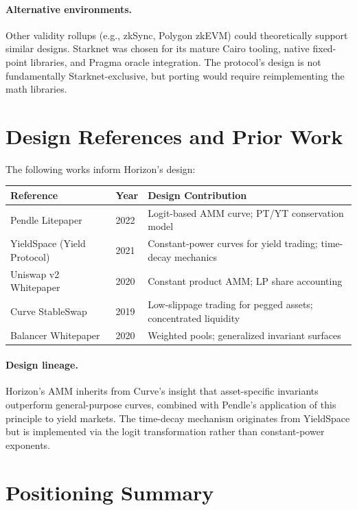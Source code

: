 \paragraph{Alternative environments.}
Other validity rollups (e.g., zkSync, Polygon zkEVM) could theoretically support similar designs. Starknet was chosen for its mature Cairo tooling, native fixed-point libraries, and Pragma oracle integration. The protocol's design is not fundamentally Starknet-exclusive, but porting would require reimplementing the math libraries.


\section{Design References and Prior Work}

The following works inform Horizon's design:

\begin{center}
\begin{tabularx}{\textwidth}{l l >{\raggedright\arraybackslash}X}
\toprule
\textbf{Reference} & \textbf{Year} & \textbf{Design Contribution} \\
\midrule
Pendle Litepaper & 2022 & Logit-based AMM curve; PT/YT conservation model \\
YieldSpace (Yield Protocol) & 2021 & Constant-power curves for yield trading; time-decay mechanics \\
Uniswap v2 Whitepaper & 2020 & Constant product AMM; LP share accounting \\
Curve StableSwap & 2019 & Low-slippage trading for pegged assets; concentrated liquidity \\
Balancer Whitepaper & 2020 & Weighted pools; generalized invariant surfaces \\
\bottomrule
\end{tabularx}
\end{center}

\paragraph{Design lineage.}
Horizon's AMM inherits from Curve's insight that asset-specific invariants outperform general-purpose curves, combined with Pendle's application of this principle to yield markets. The time-decay mechanism originates from YieldSpace but is implemented via the logit transformation rather than constant-power exponents.


\section{Positioning Summary}


